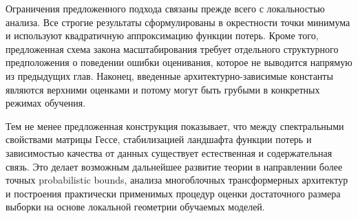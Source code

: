 Ограничения предложенного подхода связаны прежде всего с локальностью анализа. Все строгие результаты сформулированы в окрестности точки минимума и используют квадратичную аппроксимацию функции потерь. Кроме того, предложенная схема закона масштабирования требует отдельного структурного предположения о поведении ошибки оценивания, которое не выводится напрямую из предыдущих глав. Наконец, введенные архитектурно-зависимые константы являются верхними оценками и потому могут быть грубыми в конкретных режимах обучения.

Тем не менее предложенная конструкция показывает, что между спектральными свойствами матрицы Гессе, стабилизацией ландшафта функции потерь и зависимостью качества от данных существует естественная и содержательная связь. Это делает возможным дальнейшее развитие теории в направлении более точных probabilistic bounds, анализа многоблочных трансформерных архитектур и построения практически применимых процедур оценки достаточного размера выборки на основе локальной геометрии обучаемых моделей.